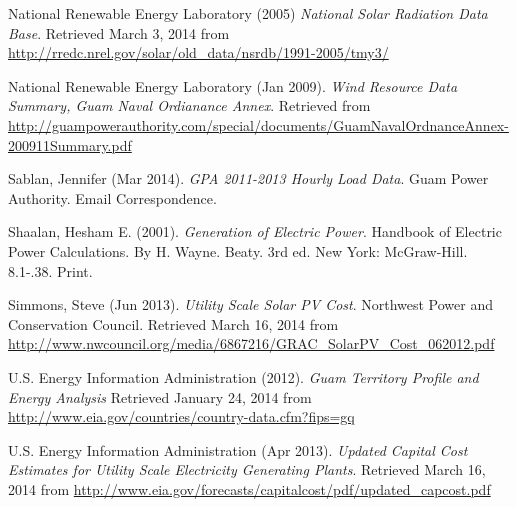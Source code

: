 \documentclass[12pt,letterpaper,fleqn]{article}
\begin{document}
\begin{thebibliography}{99}
  National Renewable Energy Laboratory (2005)
  \emph{National Solar Radiation Data Base}.
  Retrieved March 3, 2014 from
  \url{http://rredc.nrel.gov/solar/old_data/nsrdb/1991-2005/tmy3/}

  National Renewable Energy Laboratory (Jan 2009).
  \emph{Wind Resource Data Summary, Guam Naval Ordianance Annex}.
  Retrieved from
  \url{http://guampowerauthority.com/special/documents/GuamNavalOrdnanceAnnex-200911Summary.pdf}

  Sablan, Jennifer (Mar 2014).
  \emph{GPA 2011-2013 Hourly Load Data}.
  Guam Power Authority.
  Email Correspondence.

  Shaalan, Hesham E. (2001).
  \emph{Generation of Electric Power}.
  Handbook of Electric Power Calculations.
  By H. Wayne. Beaty.
  3rd ed. New York: McGraw-Hill.
  8.1-.38.
  Print.

  Simmons, Steve (Jun 2013).
  \emph{Utility Scale Solar PV Cost}.
  Northwest Power and Conservation Council.
  Retrieved March 16, 2014 from
  \url{http://www.nwcouncil.org/media/6867216/GRAC_SolarPV_Cost_062012.pdf}

  U.S. Energy Information Administration (2012).
  \emph{Guam Territory Profile and Energy Analysis}
  Retrieved January 24, 2014 from
  \url{http://www.eia.gov/countries/country-data.cfm?fips=gq}

  U.S. Energy Information Administration (Apr 2013).
  \emph{Updated Capital Cost Estimates for Utility Scale Electricity
    Generating Plants}.
  Retrieved March 16, 2014 from
  \url{http://www.eia.gov/forecasts/capitalcost/pdf/updated_capcost.pdf}

\end{thebibliography}
\end{document}
